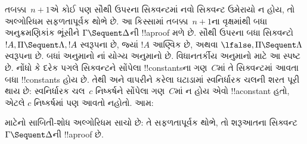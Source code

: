 \documentclass[../../../include/open-logic-section]{subfiles}
\begin{document}
તબક્કા~$n+1$એ કોઈ પણ સૌથી ઉપરના સિક્વન્ટમાં નવો
સિક્વન્ટ ઉમેરાયો ન હોય, તો અલ્ગોરિધમ સફળતાપૂર્વક
થોભે છે. આ કિસ્સામાં તબક્કા~$n+1$ના વૃક્ષમાંથી
બધા અનુક્રમણિકાંક ભૂંસીને $\Gamma \Sequent \Delta$ની
!!a{proof} મળે છે. સૌથી ઉપરના બધા સિક્વન્ટો
$!A, \Pi \Sequent \Lambda, !A$ સ્વરૂપના છે, જ્યાં $!A$ આણ્વિક છે,
અથવા $\lfalse, \Pi \Sequent \Lambda$ સ્વરૂપના છે.
બધાં અનુમાનો નાં યોગ્ય અનુમાનો છે.
વિધાનતર્કીય અનુમાનો માટે આ સ્પષ્ટ છે.
નોંધો કે દરેક પગલે સિક્વન્ટને સોંપેલા
!!{constant}sના ગણ~$C$માં તે સિક્વન્ટમાં આવતા
બધા !!{constant}s હોય છે. તેથી
\LeftR{\lexists} અને \RightR{\lforall} વાપરીને
કરેલા ઘટાડામાં સ્વનિર્ધારક ચલની શરત પૂરી થાય છે:
સ્વનિર્ધારક ચલ~$c$ નિષ્કર્ષને સોંપેલા ગણ~$C$માં
ન હોય એવો !!a{constant} હતો, એટલે $c$ નિષ્કર્ષમાં
પણ આવતો નહોતો. આમ:

\begin{prop}
 માટેનો સાબિતી-શોધ અલ્ગોરિધમ સાચો છે:
તે સફળતાપૂર્વક થોભે, તો શરૂઆતના
સિક્વન્ટ~$\Gamma \Sequent \Delta$ની !!a{proof} છે.
\end{prop}
\end{document}
